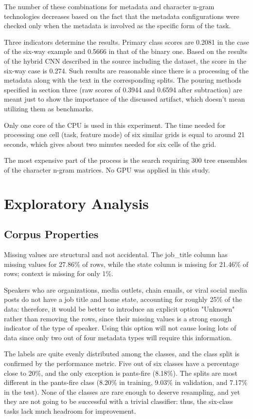 \documentclass[10pt,twocolumn,twoside,a4paper]{article}
\begin{document}
The number of these combinations for metadata and character n-gram technologies decreases based on the fact that the metadata configurations were checked only when the metadata is involved as the specific form of the task.

Three indicators determine the results. Primary class scores are 0.2081 in the case of the six-way example and 0.5666 in that of the binary one. Based on the results of the hybrid CNN described in the source including the dataset, the score in the six-way case is 0.274. Such results are reasonable since there is a processing of the metadata along with the text in the corresponding splits. The pouring methods specified in section three (raw scores of 0.3944 and 0.6594 after subtraction) are meant just to show the importance of the discussed artifact, which doesn't mean utilizing them as benchmarks.

Only one core of the CPU is used in this experiment. The time needed for processing one cell (task, feature mode) of six similar grids is equal to around 21 seconds, which gives about two minutes needed for six cells of the grid.

The most expensive part of the process is the search requiring 300 tree ensembles of the character n-gram matrices. No GPU was applied in this study.

\section{Exploratory Analysis}

\subsection{Corpus Properties}

Missing values are structural and not accidental. The job\_title column has missing values for 27.86\% of rows, while the state column is missing for 21.46\% of rows; context is missing for only 1\%.

Speakers who are organizations, media outlets, chain emails, or viral social media posts do not have a job title and home state, accounting for roughly 25\% of the data: therefore, it would be better to introduce an explicit option "Unknown" rather than removing the rows, since their missing values is a strong enough indicator of the type of speaker. Using this option will not cause losing lots of data since only two out of four metadata types will require this information.

The labels are quite evenly distributed among the classes, and the class split is confirmed by the performance metric. Five out of six classes have a percentage close to 20\%, and the only exception is pants-fire (8.18\%). The splits are most different in the pants-fire class (8.20\% in training, 9.03\% in validation, and 7.17\% in the test). None of the classes are rare enough to deserve resampling, and yet they are not going to be successful with a trivial classifier: thus, the six-class tasks lack much headroom for improvement.
\end{document}
